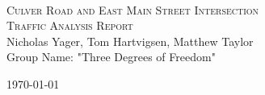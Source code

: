 \begin{titlepage}

\begin{center}

~\\[4cm]

\textsc{\Large Culver Road and East Main Street Intersection}\\[1.5cm]
\textsc{\huge Traffic Analysis Report}\\[8.5cm]

Nicholas Yager, Tom Hartvigsen, Matthew Taylor\\
Group Name: "Three Degrees of Freedom"

\vfill

{ \today}

\end{center}
\end{titlepage}